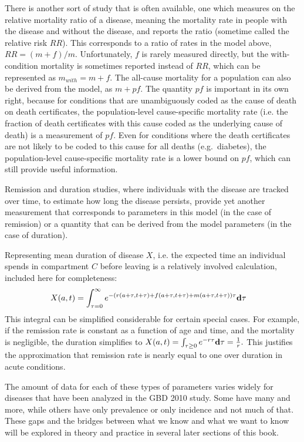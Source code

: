 There is another sort of study that is often available, one which
measures on the relative mortality ratio of a disease, meaning the
mortality rate in people with the disease and without the disease, and
reports the ratio (sometime called the relative risk $RR$).  This
corresponds to a ratio of rates in the model above, $RR = (m+f) / m$.
Unfortunately, $f$ is rarely measured directly, but the
with-condition mortality is sometimes reported instead of $RR$, which
can be represented as $m_{with} = m+f$.  The all-cause mortality for a
population can also be derived from the model, as $m + pf$.  The
quantity $pf$ is important in its own right, because for conditions
that are unambiguously coded as the cause of death on death
certificates, the population-level cause-specific mortality rate
(i.e. the fraction of death certificates with this cause coded as the
underlying cause of death) is a measurement of $pf$.  Even for
conditions where the death certificates are not likely to be coded to
this cause for all deaths (e.g.~diabetes), the population-level
cause-specific mortality rate is a lower bound on $pf$, which can
still provide useful information.

Remission and duration studies, where individuals with the disease are
tracked over time, to estimate how long the disease persists, provide
yet another measurement that corresponds to parameters in this model
(in the case of remission) or a quantity that can be derived from the
model parameters (in the case of duration).

Representing mean duration of disease $X$, i.e. the expected time an
individual spends in compartment $C$ before leaving is a relatively
involved calculation, included here for completeness:
\begin{align*}
X(a, t) &
= \int_{\tau = 0}^\infty e^{-\left(r(a+\tau, t+\tau) + f(a+\tau, t+\tau) + m(a+\tau, t+\tau)\right) \tau}\mathbf{d} \tau
\end{align*}
This integral can be simplified considerable for certain special
cases.  For example, if the remission rate is constant as a function
of age and time, and the mortality is negligible, the duration
simplifies to $X(a,t) = \int_{\tau \geq 0} e^{-r\tau}\mathbf{d} \tau =
\frac{1}{r}.$ This justifies the approximation that remission rate is
nearly equal to one over duration in acute conditions.

The amount of data for each of these types of parameters varies widely
for diseases that have been analyzed in the GBD 2010 study. Some have
many and more, while others have only prevalence or only incidence and
not much of that. These gaps and the bridges between what we know and
what we want to know will be explored in theory and practice in
several later sections of this book.

